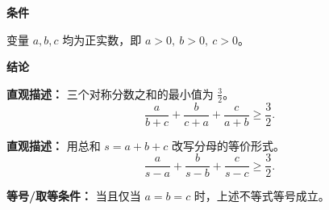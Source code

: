 \begin{statementbox}

\textbf{\textcolor{CStatement}{条件}}
\begin{description}[style=nextline, leftmargin=2.8em, labelsep=0.5em, itemsep=0.35em]
    \item[\textbf{\textcolor{CStatement}{条件 1（正实数）：}}] 变量 $a,b,c$ 均为正实数，即 $a>0,\ b>0,\ c>0$。
\end{description}

\textbf{\textcolor{CStatement}{结论}}
\begin{description}[style=nextline, leftmargin=2.8em, labelsep=0.5em, itemsep=0.45em]
    \item[\textbf{\textcolor{CStatement}{结论一（核心形式）：}}]
    \textbf{\textcolor{CStatement}{直观描述：}} 三个对称分数之和的最小值为 $\frac{3}{2}$。
    \[
    \frac{a}{b+c} + \frac{b}{c+a} + \frac{c}{a+b} \ge \frac{3}{2}.
    \]

    \item[\textbf{\textcolor{CStatement}{推广结论（和表示形式）：}}]
    \textbf{\textcolor{CStatement}{直观描述：}} 用总和 $s=a+b+c$ 改写分母的等价形式。
    \[
    \frac{a}{s-a} + \frac{b}{s-b} + \frac{c}{s-c} \ge \frac{3}{2}.
    \]
\end{description}

\textbf{\textcolor{CStatement}{等号/取等条件：}} 当且仅当 $a = b = c$ 时，上述不等式等号成立。

\end{statementbox}
